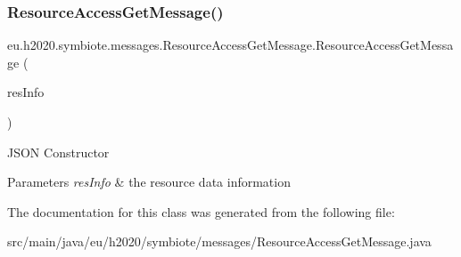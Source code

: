 \subsubsection{\texorpdfstring{Resource\+Access\+Get\+Message()}{ResourceAccessGetMessage()}}
{\footnotesize\ttfamily eu.\+h2020.\+symbiote.\+messages.\+Resource\+Access\+Get\+Message.\+Resource\+Access\+Get\+Message (\begin{DoxyParamCaption}\item[{@Json\+Property(\char`\"{}resource\+Info\char`\"{}) Resource\+Info}]{res\+Info }\end{DoxyParamCaption})}

J\+S\+ON Constructor 
\begin{DoxyParams}{Parameters}
{\em res\+Info} & the resource data information \\
\hline
\end{DoxyParams}


The documentation for this class was generated from the following file\+:\begin{DoxyCompactItemize}
\item 
src/main/java/eu/h2020/symbiote/messages/Resource\+Access\+Get\+Message.\+java\end{DoxyCompactItemize}
